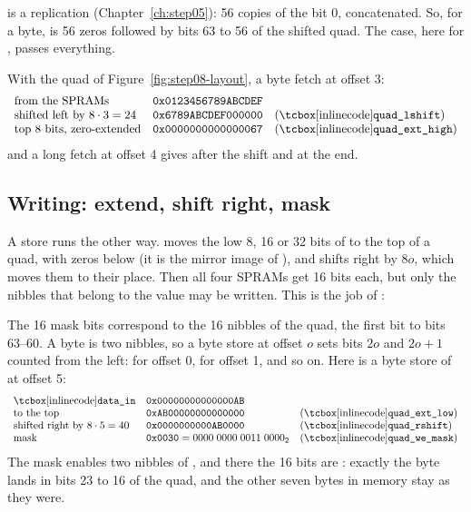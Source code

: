 
 is a replication (Chapter~\ref{ch:step05}): 56 copies of
the bit 0, concatenated. So, for a byte,  is 56 zeros followed by
bits 63 to 56 of the shifted quad. The  case, here for
, passes everything.

With the quad of Figure~\ref{fig:step08-layout}, a byte fetch at offset 3:
\[
\begin{array}{lll}
\text{from the SPRAMs} & \mathtt{0x0123456789ABCDEF} & \\
\text{shifted left by } 8 \cdot 3 = 24 & \mathtt{0x6789ABCDEF000000} &
  \text{(\cc{quad_lshift})} \\
\text{top 8 bits, zero-extended} & \mathtt{0x0000000000000067} &
  \text{(\cc{quad_ext_high})}
\end{array}
\]
and a long fetch at offset 4 gives  after the shift and
 at the end.

\subsection*{Writing: extend, shift right, mask}

A store runs the other way.  moves the low 8, 16 or 32 bits of
 to the top of a quad, with zeros below (it is the mirror image of
), and  shifts right by $8o$, which moves
them to their place. Then all four SPRAMs get 16 bits each, but only the
nibbles that belong to the value may be written. This is the job of
:


The 16 mask bits  correspond to the 16 nibbles of
the quad, the first bit to bits 63--60. A byte is two nibbles, so a byte store
at offset $o$ sets bits $2o$ and $2o+1$ counted from the left: 
for offset 0,  for offset 1, and so on. Here is a byte store of
 at offset 5:
\[
\begin{array}{lll}
\text{\cc{data_in}} & \mathtt{0x00000000000000AB} & \\
\text{to the top} & \mathtt{0xAB00000000000000} & \text{(\cc{quad_ext_low})} \\
\text{shifted right by } 8 \cdot 5 = 40 & \mathtt{0x0000000000AB0000} &
  \text{(\cc{quad_rshift})} \\
\text{mask} & \mathtt{0x0030} = 0000\;0000\;0011\;0000_2 &
  \text{(\cc{quad_we_mask})}
\end{array}
\]
The mask enables two nibbles of , and there the 16 bits are
: exactly the byte  lands in bits 23 to 16 of the quad,
and the other seven bytes in memory stay as they were.

